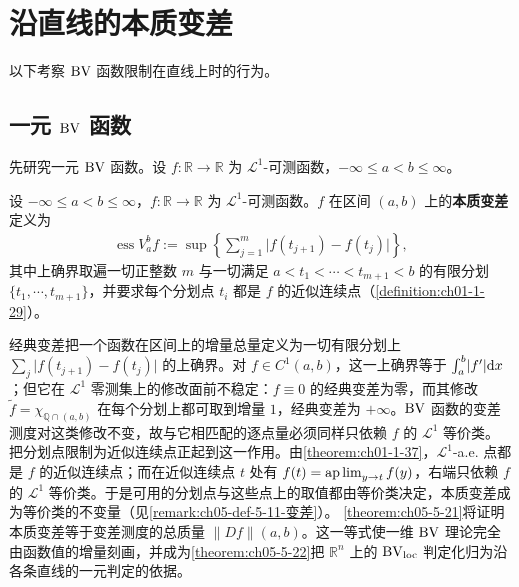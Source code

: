\documentclass[../../main.tex]{subfiles}%
\begin{document}
\section{沿直线的本质变差}\label{section:ch05-10}

以下考察 $\mathrm{BV}$ 函数限制在直线上时的行为。

\subsection{一元 $\mathrm{BV}$ 函数}\label{subsection:ch05-10-1}

先研究一元 $\mathrm{BV}$ 函数。设 $f:\mathbb{R}\to\mathbb{R}$ 为 $\mathcal{L}^1$-可测函数，$-\infty\leqslant a<b\leqslant\infty$。

\begin{definition}[本质变差]\label{definition:ch05-5-11}
设 $-\infty\leqslant a<b\leqslant\infty$，$f:\mathbb{R}\to\mathbb{R}$ 为 $\mathcal{L}^1$-可测函数。$f$ 在区间 $(a,b)$ 上的\textbf{本质变差}定义为
\begin{align*}
\operatorname{ess}V_a^b f:=\sup\left\{\sum_{j=1}^m\lvert f(t_{j+1})-f(t_j)\rvert\right\},
\end{align*}
其中上确界取遍一切正整数 $m$ 与一切满足 $a<t_1<\cdots<t_{m+1}<b$ 的有限分划 $\{t_1,\cdots,t_{m+1}\}$，并要求每个分划点 $t_i$ 都是 $f$ 的近似连续点（\cref{definition:ch01-1-29}）。%
\end{definition}

\begin{remark}\label{remark:ch05-def-5-11-动机}
经典变差把一个函数在区间上的增量总量定义为一切有限分划上 $\sum_j\lvert f(t_{j+1})-f(t_j)\rvert$ 的上确界。对 $f\in C^1(a,b)$，这一上确界等于 $\int_a^b\lvert f'\rvert\mathrm{d} x$；但它在 $\mathcal{L}^1$ 零测集上的修改面前不稳定：$f\equiv0$ 的经典变差为零，而其修改 $\tilde f=\chi_{\mathbb{Q}\cap(a,b)}$ 在每个分划上都可取到增量 $1$，经典变差为 $+\infty$。$\mathrm{BV}$ 函数的变差测度对这类修改不变，故与它相匹配的逐点量必须同样只依赖 $f$ 的 $\mathcal{L}^1$ 等价类。
把分划点限制为近似连续点正起到这一作用。由\cref{theorem:ch01-1-37}，$\mathcal{L}^1$-a.e. 点都是 $f$ 的近似连续点；而在近似连续点 $t$ 处有 $f(t)=\operatorname*{ap\,lim}_{y\to t}f(y)$，右端只依赖 $f$ 的 $\mathcal{L}^1$ 等价类。于是可用的分划点与这些点上的取值都由等价类决定，本质变差成为等价类的不变量（见\cref{remark:ch05-def-5-11-变差}）。%
\cref{theorem:ch05-5-21}将证明本质变差等于变差测度的总质量 $\lVert Df\rVert(a,b)$。这一等式使一维 $\mathrm{BV}$ 理论完全由函数值的增量刻画，并成为\cref{theorem:ch05-5-22}把 $\mathbb{R}^n$ 上的 $\mathrm{BV}_{\mathrm{loc}}$ 判定化归为沿各条直线的一元判定的依据。%
\end{remark}
\end{document}
